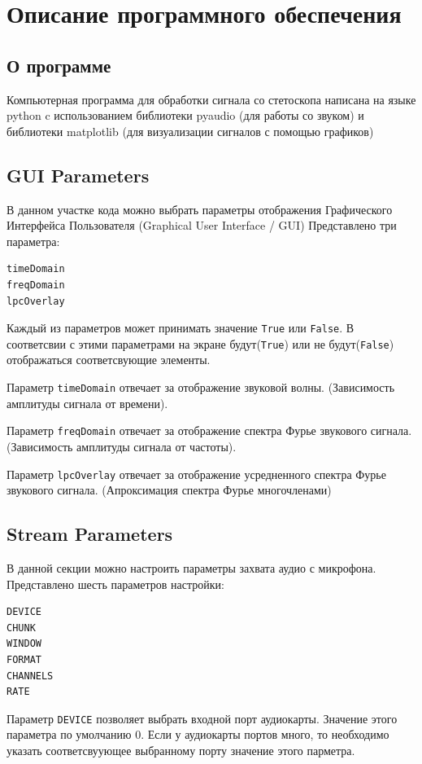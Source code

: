 \newpage
\section{Описание программного обеспечения}
\subsection{О программе}
Компьютерная программа для обработки сигнала со стетоскопа написана на языке python c использованием библиотеки pyaudio (для работы со звуком) и библиотеки matplotlib (для визуализации сигналов с помощью графиков)
\subsection{GUI Parameters}
В данном участке кода можно выбрать параметры отображения Графического Интерфейса Пользователя (Graphical User Interface / GUI)
Представлено три параметра:
\begin{verbatim}
timeDomain
freqDomain
lpcOverlay
\end{verbatim}

Каждый из параметров может принимать значение \verb|True| или \verb|False|. В соответсвии с этими параметрами на экране будут(\verb|True|) или не будут(\verb|False|) отображаться соответсвующие элементы.

Параметр \verb|timeDomain| отвечает за отображение звуковой волны. (Зависимость амплитуды сигнала от времени). 

Параметр \verb|freqDomain| отвечает за отображение спектра Фурье звукового сигнала. (Зависимость амплитуды сигнала от частоты). 

Параметр \verb|lpcOverlay| отвечает за отображение усредненного спектра Фурье звукового сигнала. (Апроксимация спектра Фурье многочленами)

\subsection{Stream Parameters}
В данной секции можно настроить параметры захвата аудио с микрофона. Представлено шесть параметров настройки:
\begin{verbatim}
DEVICE
CHUNK
WINDOW
FORMAT
CHANNELS
RATE
\end{verbatim}

Параметр \verb|DEVICE| позволяет выбрать входной порт аудиокарты. Значение этого параметра по умолчанию 0. Если у аудиокарты портов много, то необходимо указать соответсвуующее выбранному  порту значение этого парметра. 

